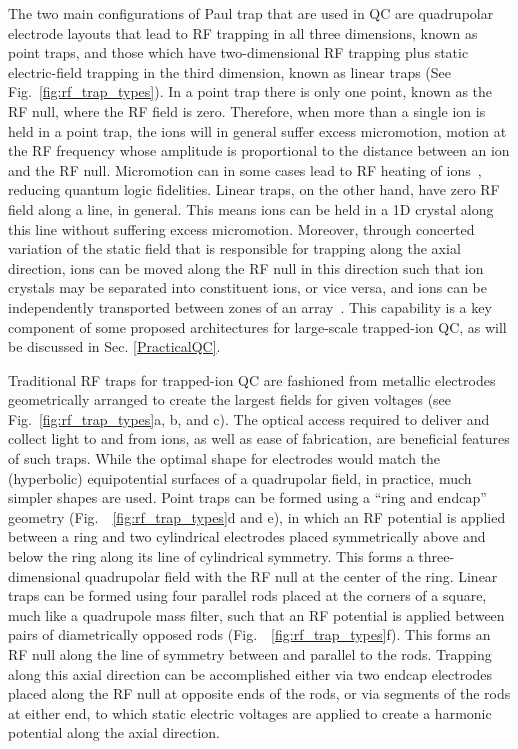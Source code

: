 \documentclass[%
reprint,
 amsmath,amssymb,
]{revtex4-1}
\begin{document}
The two main configurations of Paul trap that are used in QC are quadrupolar electrode layouts that lead to RF trapping in all three dimensions, known as point traps, and those which have two-dimensional RF trapping plus static electric-field trapping in the third dimension, known as linear traps (See Fig.~\ref{fig:rf_trap_types}).  In a point trap there is only one point, known as the RF null, where the RF field is zero.  Therefore, when more than a single ion is held in a point trap, the ions will in general suffer excess micromotion, motion at the RF frequency whose amplitude is proportional to the distance between an ion and the RF null.  Micromotion can in some cases lead to RF heating of ions~\cite{Wineland1998}, reducing quantum logic fidelities.  Linear traps, on the other hand, have zero RF field along a line, in general.  This means ions can be held in a 1D crystal along this line without suffering excess micromotion.  Moreover, through concerted variation of the static field that is responsible for trapping along the axial direction, ions can be moved along the RF null in this direction such that ion crystals may be separated into constituent ions, or vice versa, and ions can be independently transported between zones of an array~\cite{NIST:ion_transport:2002}.  This capability is a key component of some proposed architectures for large-scale trapped-ion QC, as will be discussed in Sec. \ref{PracticalQC}.

Traditional RF traps for trapped-ion QC are fashioned from metallic electrodes geometrically arranged to create the largest fields for given voltages (see Fig.~\ref{fig:rf_trap_types}a, b, and c).  The optical access required to deliver and collect light to and from ions, as well as ease of fabrication, are beneficial features of such traps.  While the optimal shape for electrodes would match the (hyperbolic) equipotential surfaces of a quadrupolar field, in practice, much simpler shapes are used.  Point traps can be formed using a ``ring and endcap'' geometry (Fig.~~\ref{fig:rf_trap_types}d and e), in which an RF potential is applied between a ring and two cylindrical electrodes placed symmetrically above and below the ring along its line of cylindrical symmetry.  This forms a three-dimensional quadrupolar field with the RF null at the center of the ring.  Linear traps can be formed using four parallel rods placed at the corners of a square, much like a quadrupole mass filter, such that an RF potential is applied between pairs of diametrically opposed rods (Fig.~~\ref{fig:rf_trap_types}f).  This forms an RF null along the line of symmetry between and parallel to the rods.  Trapping along this axial direction can be accomplished either via two endcap electrodes placed along the RF null at opposite ends of the rods, or via segments of the rods at either end, to which static electric voltages are applied to create a harmonic potential along the axial direction.
\end{document}
